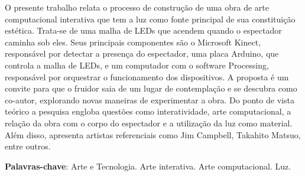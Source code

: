 \begin{RESUMO}
\thispagestyle{empty}
	\begin{SingleSpace}
	
		\hspace{-1.3 cm}O presente trabalho relata o processo de construção de uma obra de arte computacional interativa que tem a luz como fonte principal de sua constituição estética. Trata-se de uma malha de LEDs que acendem quando o espectador caminha sob eles. Seus principais componentes são o Microsoft Kinect, responsável por detectar a presença do espectador, uma placa Arduino, que controla a malha de LEDs, e um computador com o software Processing, responsável por orquestrar o funcionamento dos dispositivos. A proposta é um convite para que o fruidor saia de um lugar de contemplação e se descubra como co-autor, explorando novas maneiras de experimentar a obra.
		Do ponto de vista teórico a pesquisa engloba questões como interatividade, arte computacional, a relação da obra com o corpo do espectador e a utilização da luz como material. Além disso, apresenta artistas referenciais como Jim Campbell, Takahito Matsuo, entre outros.
		
		\vspace*{0.5cm}\hspace{-1.3 cm}\textbf{Palavras-chave}: Arte e Tecnologia. Arte interativa. Arte computacional. Luz.
		
	\end{SingleSpace}
\end{RESUMO}


